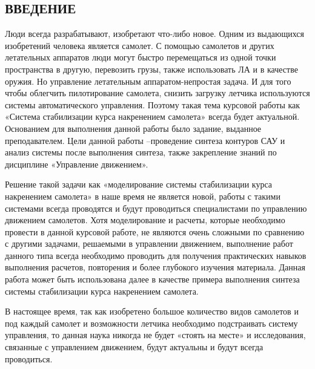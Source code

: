 \newpage
\begin{center}
    \section*{ВВЕДЕНИЕ}
\end{center}

Люди всегда разрабатывают, изобретают что-либо новое. Одним из выдающихся изобретений человека является самолет. С помощью самолетов и других летательных аппаратов люди могут быстро перемещаться из одной точки пространства в другую, перевозить грузы, также использовать ЛА и в качестве оружия. Но управление летательным аппаратом-непростая задача. И для того чтобы облегчить пилотирование самолета, снизить загрузку летчика используются системы автоматического управления. Поэтому такая тема курсовой работы как «Система стабилизации курса накренением самолета» всегда будет актуальной.  
Основанием для выполнения данной работы было задание, выданное преподавателем. Цели данной работы –проведение синтеза контуров САУ и анализ системы после выполнения синтеза, также закрепление знаний по дисциплине «Управление движением».

Решение такой задачи как «моделирование системы стабилизации курса накренением самолета» в наше время не является новой, работы с такими системами всегда проводятся и будут проводиться специалистами по управлению движением самолетов. Хотя моделирование и расчеты, которые необходимо провести в данной курсовой работе, не являются очень сложными по сравнению с другими задачами, решаемыми в управлении движением, выполнение работ данного типа всегда необходимо проводить для получения практических навыков выполнения расчетов, повторения и более глубокого изучения материала. Данная работа может быть использована далее в качестве примера выполнения синтеза системы стабилизации курса накренением самолета. 

В настоящее время, так как изобретено большое количество видов самолетов и под каждый самолет и возможности летчика необходимо подстраивать систему управления, то данная наука никогда не будет «стоять на месте» и исследования, связанные с управлением движением, будут актуальны и будут всегда проводиться.
